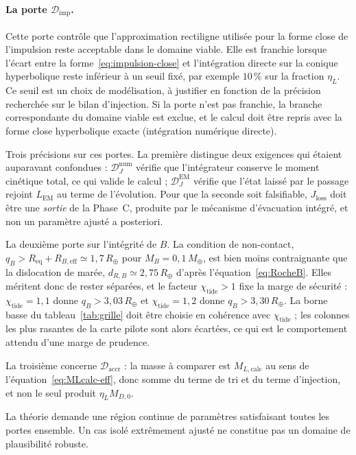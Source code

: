 \documentclass[11pt,a4paper,openany]{report}
\newcommand{\Mt}{M_{\oplus}}
\newcommand{\Rt}{R_{\oplus}}
\newcommand{\Req}{R_{\mathrm{eq}}}
\begin{document}
\paragraph{La porte $\mathcal{D}_{\mathrm{imp}}$.}
Cette porte contrôle que l'approximation rectiligne utilisée pour la forme close de l'impulsion
reste acceptable dans le domaine viable. Elle est franchie lorsque l'écart entre la
forme~\eqref{eq:impulsion-close} et l'intégration directe sur la conique hyperbolique reste
inférieur à un seuil fixé, par exemple $10\,\%$ sur la fraction $\eta_L$. Ce seuil est un choix
de modélisation, à justifier en fonction de la précision recherchée sur le bilan d'injection. Si la
porte n'est pas franchie, la branche correspondante du domaine viable est exclue, et le calcul doit
être repris avec la forme close hyperbolique exacte (intégration numérique directe).

Trois précisions sur ces portes. La première distingue deux exigences qui étaient auparavant
confondues : $\mathcal{D}_J^{\mathrm{num}}$ vérifie que l'intégrateur conserve le moment cinétique
total, ce qui valide le calcul ; $\mathcal{D}_J^{\mathrm{EM}}$ vérifie que l'état laissé par le
passage rejoint $L_{\mathrm{EM}}$ au terme de l'évolution. Pour que la seconde soit falsifiable,
$J_{\mathrm{loss}}$ doit être une \emph{sortie} de la Phase~C, produite par le mécanisme
d'évacuation intégré, et non un paramètre ajusté a posteriori.

La deuxième porte sur l'intégrité de $B$. La condition de non-contact,
$q_B>\Req+R_{B,\mathrm{eff}}\simeq1{,}7\,\Rt$ pour $M_B=0{,}1\,\Mt$, est bien moins contraignante
que la dislocation de marée, $d_{R,B}\simeq2{,}75\,\Rt$ d'après l'équation~\eqref{eq:RocheB}. Elles
méritent donc de rester séparées, et le facteur $\chi_{\mathrm{tide}}>1$ fixe la marge de sécurité :
$\chi_{\mathrm{tide}}=1{,}1$ donne $q_B>3{,}03\,\Rt$ et $\chi_{\mathrm{tide}}=1{,}2$ donne
$q_B>3{,}30\,\Rt$. La borne basse du tableau~\ref{tab:grille} doit être choisie en cohérence avec
$\chi_{\mathrm{tide}}$ ; les colonnes les plus rasantes de la carte pilote sont alors écartées, ce
qui est le comportement attendu d'une marge de prudence.

La troisième concerne $\mathcal{D}_{\mathrm{accr}}$ : la masse à comparer est
$M_{L,\mathrm{calc}}$ au sens de l'équation~\eqref{eq:MLcalc-eff}, donc somme du terme de tri et du
terme d'injection, et non le seul produit $\eta_L M_{D,0}$.

\begin{falsif}
La théorie demande une région continue de paramètres satisfaisant toutes les portes ensemble.
Un cas isolé extrêmement ajusté ne constitue pas un domaine de plausibilité robuste.
\end{falsif}
\end{document}
